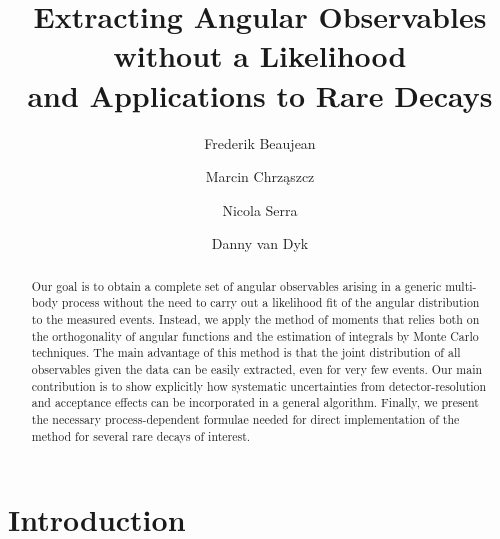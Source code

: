 \documentclass[aps,prd,reprint,nofootinbib,preprintnumbers]{revtex4}
\newcommand{\fred}[1]{{\color{brown!85!black}#1}}
\begin{document}
\allowdisplaybreaks

\title{Extracting Angular Observables without a Likelihood\\and Applications to Rare Decays}
\author{Frederik Beaujean}
\author{Marcin Chrz\k{a}szcz}
\author{Nicola Serra}
\author{Danny van Dyk}

\begin{abstract}
  \fred{Our goal is to obtain a complete set} of angular observables
  arising in a generic multi-body process without the need to carry
  out a likelihood fit of the angular distribution to the measured
  events. Instead, we \fred{apply the method of moments} that relies
  both on the orthogonality of angular functions and the estimation of
  integrals by Monte Carlo techniques. \fred{The main advantage of
    this method is that the joint distribution of all observables
    given the data can be easily extracted, even for very few
    events. Our main contribution is to show explicitly how systematic
    uncertainties from detector-resolution and acceptance effects can
    be incorporated in a general algorithm. Finally, we present the
    necessary process-dependent formulae needed for direct
    implementation of the method for several rare decays of
    interest.}
\end{abstract}

\maketitle

\section{Introduction}
\label{sec:intro}
\end{document}
